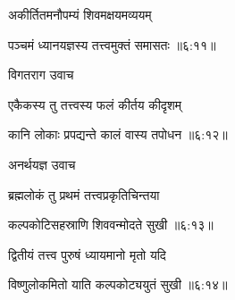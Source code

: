 {\devanagarifont अकीर्तितमनौपम्यं शिवमक्षयमव्ययम्  \danda\dontdisplaylinenum }%


{\devanagarifont पञ्चमं ध्यानयज्ञस्य तत्त्वमुक्तं समासतः {॥६:११॥} \veg\dontdisplaylinenum }%

{\devanagarifont विगतराग उवाच {\dandab}\dontdisplaylinenum  }%
 
{\devanagarifont एकैकस्य तु तत्त्वस्य फलं कीर्तय कीदृशम् \thinspace{\danda} \dontdisplaylinenum }%


{\devanagarifont कानि लोकाः प्रपद्यन्ते कालं वास्य तपोधन {॥६:१२॥} \veg\dontdisplaylinenum }%

{\devanagarifont अनर्थयज्ञ उवाच {\dandab}\dontdisplaylinenum  }%
 
{\devanagarifont ब्रह्मलोकं तु प्रथमं तत्त्वप्रकृतिचिन्तया \thinspace{\danda} \dontdisplaylinenum }%


{\devanagarifont कल्पकोटिसहस्राणि शिववन्मोदते सुखी {॥६:१३॥} \veg\dontdisplaylinenum }%

{\devanagarifont द्वितीयं तत्त्व पुरुषं ध्यायमानो मृतो यदि \thinspace{\dandab} \dontdisplaylinenum }%
 

{\devanagarifont विष्णुलोकमितो याति कल्पकोट्ययुतं सुखी {॥६:१४॥} \veg\dontdisplaylinenum }%

